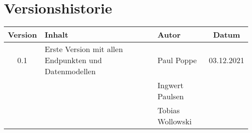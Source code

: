 \chapter*{Versionshistorie}
\begin{table}[htb]
	\begin{tabularx}{\textwidth}{|c|X|l|c|}
		\hline
\textbf{Version} & \textbf{Inhalt} & \textbf{Autor} & \textbf{Datum} \\ \hline
0.1 & Erste Version mit allen Endpunkten und Datenmodellen & Paul Poppe & 03.12.2021 \\ 
 & & Ingwert Paulsen & \\
 & & Tobias Wollowski & \\ \hline
	\end{tabularx}
\end{table}
